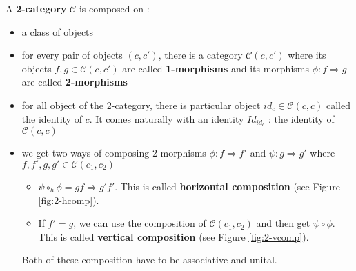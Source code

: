 \begin{defn}[2-category]
    A \textbf{2-category}\cite{kelly1974review} $\mathcal{C}$ is composed on :
    \begin{itemize}
        \item a class of objects
        \item for every pair of objects $(c,c')$, there is a category $\mathcal{C}(c,c')$ where its objects $f,g\in \mathcal{C}(c,c')$ are called \textbf{1-morphisms} and its morphisms $\phi : f\Rightarrow g$ are called \textbf{2-morphisms}
        \item for all object of the 2-category, there is particular object $id_c\in \mathcal{C}(c,c)$ called the identity of $c$. It comes naturally with an identity $Id_{id_c}$ : the identity of  $\mathcal{C}(c,c)$
        \item we get two ways of composing 2-morphisms $\phi : f\Rightarrow f'$
              and $\psi : g\Rightarrow g'$ where $f,f',g,g' \in \mathcal{C}(c_1,c_2)$
              \begin{itemize}
                  \item $\psi\circ_h\phi = gf\Rightarrow g'f'$. This is called \textbf{horizontal composition}  (see Figure \ref{fig:2-hcomp}).
                  \item If $f' = g$, we can use the composition of $\mathcal{C}(c_1,c_2)$ and then get $\psi\circ\phi$. This is called \textbf{vertical composition} (see Figure \ref{fig:2-vcomp}).
              \end{itemize}
              Both of these composition have to be associative and unital.


\end{itemize}
\end{defn}
